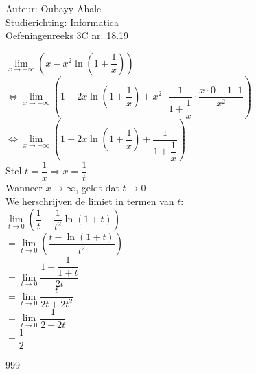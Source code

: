 \documentclass[a4paper]{article}
\newcommand{\llim}{\lim\limits}
\begin{document}
  
\noindent \large Auteur: Oubayy Ahale          \\
\noindent \large Studierichting: Informatica   \\
\noindent \large Oefeningenreeks 3C nr. 18.19  \\

\medskip

\normalsize

$ \llim_{x \rightarrow +\infty} \left( x - x^2 \ln \left( 1 + \dfrac{1}{x} \right) \right) $\\

$ \Leftrightarrow \llim_{x \rightarrow +\infty} \left( 1 - 2x \ln \left( 1 + \dfrac{1}{x} \right) + x^2 \cdot \dfrac{1}{1 + \dfrac{1}{x}} \cdot \dfrac{x \cdot 0 - 1 \cdot 1}{x^2} \right) $\\

$ \Leftrightarrow \llim_{x \rightarrow +\infty} \left( 1 - 2x \ln \left( 1 + \dfrac{1}{x} \right) + \dfrac{1}{1 + \dfrac{1}{x}} \right) $\\

Stel $ t = \dfrac{1}{x} \Rightarrow  x = \dfrac{1}{t} $\\

Wanneer $ x \to \infty $, geldt dat $ t \to 0 $\\

We herschrijven de limiet in termen van $ t $:\\

$ \llim_{t \rightarrow 0} \left( \dfrac{1}{t} - \dfrac{1}{t^2} \ln (1 + t) \right) $\\

$ = \llim_{t \rightarrow 0} \left( \dfrac{t - \ln (1+t)}{t^2} \right) $\\

$ = \llim_{t \rightarrow 0} \dfrac{1 - \dfrac{1}{1 + t}}{2t} $\\

$ = \llim_{t \rightarrow 0} \dfrac{t}{2t + 2t^2} $\\

$ = \llim_{t \rightarrow 0} \dfrac{1}{2 + 2t} $\\

$ = \dfrac{1}{2} $\\

\begin{thebibliography}{999}
\end{thebibliography}
\end{document}
